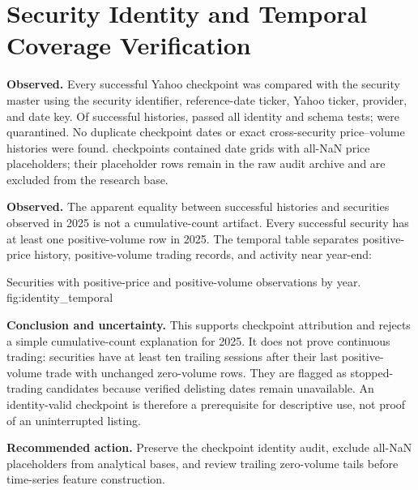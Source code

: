 \section{Security Identity and Temporal Coverage Verification}

\textbf{Observed.} Every successful Yahoo checkpoint was compared with the
security master using the security identifier, reference-date ticker, Yahoo
ticker, provider, and date key. Of \YahooSuccess{} successful histories,
\IdentityValid{} passed all identity and schema tests; \IdentityInvalid{} were
quarantined. No duplicate checkpoint dates or exact cross-security
price--volume histories were found. \PlaceholderCheckpoints{} checkpoints
contained date grids with all-NaN price placeholders; their \PlaceholderRows{}
placeholder rows remain in the raw audit archive and are excluded from the
research base.

\textbf{Observed.} The apparent equality between \YahooSuccess{} successful
histories and \YahooSuccess{} securities observed in 2025 is not a
cumulative-count artifact. Every
successful security has at least one positive-volume row in 2025. The temporal
table separates positive-price history, positive-volume trading records, and
activity near year-end:


  {Securities with positive-price and positive-volume observations by year.}
  {fig:identity_temporal}

\textbf{Conclusion and uncertainty.} This supports checkpoint attribution and
rejects a simple cumulative-count explanation for 2025. It does not prove
continuous trading: \StoppedTradingCandidates{} securities have at least ten
trailing sessions after their last positive-volume trade with unchanged
zero-volume rows. They are flagged as stopped-trading candidates because
verified delisting dates remain unavailable. An identity-valid checkpoint is
therefore a prerequisite for descriptive use, not proof of an uninterrupted
listing.

\textbf{Recommended action.} Preserve the checkpoint identity audit, exclude
all-NaN placeholders from analytical bases, and review trailing zero-volume
tails before time-series feature construction.
